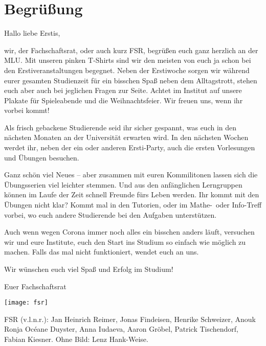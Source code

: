 \section{Begrüßung}

\begin{spacing}{1.5}
    \setlength{\parskip}{1.6ex}

    Hallo liebe Erstis,

    wir, der Fachschaftsrat, oder auch kurz FSR, 
    begrüßen euch ganz herzlich an der MLU.
    Mit unseren pinken T-Shirts sind wir den meisten 
    von euch ja schon bei den Erstiveranstaltungen begegnet.
    Neben der Erstiwoche sorgen wir während eurer gesamten Studienzeit
    für ein bisschen Spaß neben dem Alltagstrott, 
    stehen euch aber auch bei jeglichen Fragen zur Seite.
    Achtet im Institut auf unsere Plakate für Spieleabende und die Weihnachtsfeier.
    Wir freuen uns, wenn ihr vorbei kommt!

    Als frisch gebackene Studierende seid ihr sicher gespannt, 
    was euch in den nächsten Monaten 
    an der Universität erwarten wird. 
    In den nächsten Wochen werdet ihr, 
    neben der ein oder anderen Ersti-Party,
    auch die ersten Vorlesungen und Übungen besuchen.

    Ganz schön viel Neues -- 
    aber zusammen mit euren Kommilitonen 
    lassen sich die Übungsserien viel leichter stemmen.
    Und aus den anfänglichen Lerngruppen 
    können im Laufe der Zeit schnell Freunde fürs Leben werden.
    Ihr kommt mit den Übungen nicht klar? 
    Kommt mal in den Tutorien, 
    oder im Mathe-~oder Info-Treff vorbei, 
    wo euch andere Studierende bei den Aufgaben unterstützen.

    Auch wenn wegen Corona immer noch alles ein bisschen anders läuft,
    versuchen wir und eure Institute, euch den Start ins Studium 
    so einfach wie möglich zu machen. Falls das mal nicht funktioniert, wendet euch an uns.

    Wir wünschen euch viel Spaß und Erfolg im Studium!

    Euer Fachschaftsrat \\
\end{spacing}
\vspace*{-1ex}
\begin{center}
    \texttt{[image: fsr]}
\end{center}%
FSR (v.l.n.r.): 
Jan Heinrich Reimer,
Jonas Findeisen,
Henrike Schweizer,
Anouk Ronja Océane Duyster,
Anna Iudaeva,
Aaron Gröbel, 
Patrick Tischendorf,
Fabian Kiesner.
Ohne Bild:
Lenz Hank-Weise.

